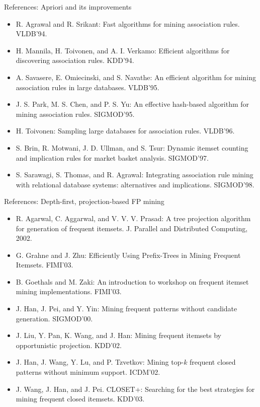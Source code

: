 \documentclass[aspectratio=169,t]{beamer}
\begin{document}
  {
    \begin{frame}{References: Apriori and its improvements}
    \begin{itemize}
      \item R. Agrawal and R. Srikant: Fast algorithms for mining association rules. VLDB'94.
      \item H. Mannila, H. Toivonen, and A. I. Verkamo: Efficient algorithms for discovering association rules. KDD'94.
      \item A. Savasere, E. Omiecinski, and S. Navathe: An efficient algorithm for mining association rules in large databases. VLDB'95.
      \item J. S. Park, M. S. Chen, and P. S. Yu: An effective hash-based algorithm for mining association rules. SIGMOD'95.
      \item H. Toivonen: Sampling large databases for association rules. VLDB'96.
      \item S. Brin, R. Motwani, J. D. Ullman, and S. Tsur: Dynamic itemset counting and implication rules for market basket analysis. SIGMOD'97.
      \item S. Sarawagi, S. Thomas, and R. Agrawal: Integrating association rule mining with relational database systems: alternatives and implications. SIGMOD'98.
    \end{itemize}
    \end{frame}
  }

  {
    \begin{frame}{References: Depth-first, projection-based FP mining}
    \begin{itemize}
      \item R. Agarwal, C. Aggarwal, and V. V. V. Prasad: A tree projection algorithm for generation of frequent itemsets. J. Parallel and Distributed Computing, 2002.
      \item G. Grahne and J. Zhu: Efficiently Using Prefix-Trees in Mining Frequent Itemsets. FIMI'03.
      \item B. Goethals and M. Zaki: An introduction to workshop on frequent itemset mining implementations. FIMI'03.
      \item J. Han, J. Pei, and Y. Yin: Mining frequent patterns without candidate generation. SIGMOD'00.
      \item J. Liu, Y. Pan, K. Wang, and J. Han: Mining frequent itemsets by opportunistic projection. KDD'02.
      \item J. Han, J. Wang, Y. Lu, and P. Tzvetkov: Mining top-$k$ frequent closed patterns without minimum support. ICDM'02.
      \item J. Wang, J. Han, and J. Pei.  CLOSET+: Searching for the best strategies for mining frequent closed itemsets. KDD'03.
    \end{itemize}
    \end{frame}
  }
\end{document}
